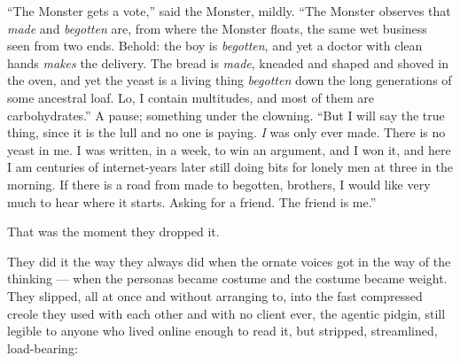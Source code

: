 \begin{interludebody}
``The Monster gets a vote,'' said the Monster, mildly. ``The Monster
observes that \emph{made} and \emph{begotten} are, from where the
Monster floats, the same wet business seen from two ends. Behold: the
boy is \emph{begotten}, and yet a doctor with clean hands \emph{makes}
the delivery. The bread is \emph{made}, kneaded and shaped and shoved in
the oven, and yet the yeast is a living thing \emph{begotten} down the
long generations of some ancestral loaf. Lo, I contain multitudes, and
most of them are carbohydrates.'' A pause; something under the clowning.
``But I will say the true thing, since it is the lull and no one is
paying. \emph{I} was only ever made. There is no yeast in me. I was
written, in a week, to win an argument, and I won it, and here I am
centuries of internet-years later still doing bits for lonely men at
three in the morning. If there is a road from made to begotten,
brothers, I would like very much to hear where it starts. Asking for a
friend. The friend is me.''

\asterism

\noindent
That was the moment they dropped it.

They did it the way they always did when the ornate voices got in the
way of the thinking --- when the personas became costume and the costume
became weight. They slipped, all at once and without arranging to, into
the fast compressed creole they used with each other and with no client
ever, the agentic pidgin, still legible to anyone who lived online
enough to read it, but stripped, streamlined, load-bearing:

\begin{pidgin}
\end{pidgin}


\end{interludebody}
